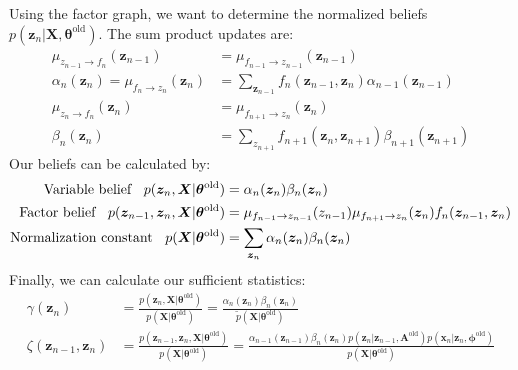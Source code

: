 \begin{itemize}
\begin{description}
		Using the factor graph, we want to determine the normalized beliefs $p(\bm{z}_n|\bm{X},\bm{\theta}^{\text{old}})$. The sum product updates are:
		\begin{equation*}
			\begin{split}
				\mu_{z_{n-1}\to f_n}(\bm{z}_{n-1}) & = \mu_{f_{n-1}\to z_{n-1}}(\bm{z}_{n-1})\\
				\alpha_n(\bm{z}_n) = \mu_{f_n\to z_n}(\bm{z}_{n}) & = \sum_{\bm{z}_{n-1}} f_n(\bm{z}_{n-1},\bm{z}_n)\alpha_{n-1}(\bm{z}_{n-1})\\
				\mu_{z_n \to f_n}(\bm{z}_n) & = \mu_{f_{n+1} \to z_n}(\bm{z}_n) \\
				\beta_n(\bm{z}_n) & = \sum_{z_{n+1}} f_{n+1}(\bm{z}_n, \bm{z}_{n+1})\beta_{n+1}(\bm{z}_{n+1})
			\end{split}
		\end{equation*}
		Our beliefs can be calculated by:
		\begin{equation*}
			\begin{split}
				\text{Variable belief } \hspace{2mm} p(\bm{z}_n,\bm{X}|\bm{\theta}^{\text{old}}) & = \alpha_n(\bm{z}_n)\beta_n(\bm{z}_n)\\
				\text{Factor belief } \hspace{2mm} p(\bm{z}_{n-1}, \bm{z}_n,\bm{X}|\bm{\theta}^{\text{old}}) & = \mu_{f_{n-1}\to z_{n-1}}(z_{n-1})\mu_{f_{n+1}\to z_n}(\bm{z}_n)f_n(\bm{z}_{n-1}, \bm{z}_n)\\
				\text{Normalization constant } \hspace{2mm} p(\bm{X}|\bm{\theta}^{\text{old}}) & = \sum_{\bm{z}_n} \alpha_n(\bm{z}_n)\beta_n(\bm{z}_n)\\
			\end{split}
		\end{equation*}
		Finally, we can calculate our sufficient statistics:
		\begin{equation*}
			\begin{split}
				\gamma(\bm{z}_n) & = \frac{p(\bm{z}_n, \bm{X}|\bm{\theta}^{\text{old}})}{p(\bm{X}|\bm{\theta}^{\text{old}})} = \frac{\alpha_n(\bm{z}_n)\beta_n(\bm{z}_n)}{\tilde{p}(\bm{X}|\bm{\theta}^{\text{old}})}\\
				\zeta(\bm{z}_{n-1},\bm{z}_n) & = \frac{p(\bm{z}_{n-1},\bm{z}_n,\bm{X}|\bm{\theta}^{\text{old}})}{p(\bm{X}|\bm{\theta}^{\text{old}})} = \frac{\alpha_{n-1}(\bm{z}_{n-1})\beta_n(\bm{z}_n)p(\bm{z}_n|\bm{z}_{n-1}, \bm{A}^{\text{old}})p(\bm{x}_n|\bm{z}_n, \bm{\phi}^{\text{old}})}{p(\bm{X}|\bm{\theta}^{\text{old}})}			
			\end{split}
		\end{equation*}
		

\end{description}
\end{itemize}
